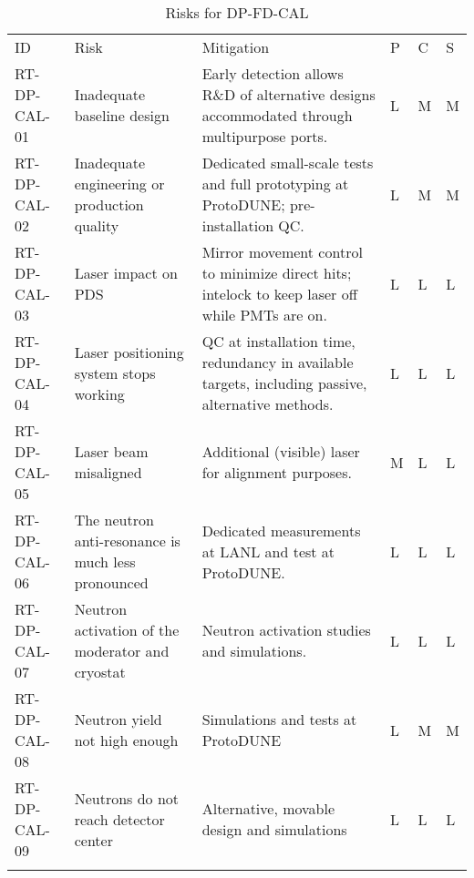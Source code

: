 
\begin{longtable}{p{}p{}p{}p{}p{}p{}} 
\caption{Risks for DP-FD-CAL } \\
\rowcolor{dunesky}
ID & Risk & Mitigation & P & C & S  \\  \colhline
RT-DP-CAL-01 & Inadequate baseline design & Early detection allows R\&D of alternative designs accommodated through multipurpose ports. & L & M & M \\  \colhline
RT-DP-CAL-02 & Inadequate engineering or production quality & Dedicated small-scale tests and full prototyping at ProtoDUNE; pre-installation QC. & L & M & M \\  \colhline
RT-DP-CAL-03 & Laser impact on PDS & Mirror movement control to minimize direct hits; intelock to keep laser off while PMTs are on. & L & L & L \\  \colhline
RT-DP-CAL-04 & Laser positioning system stops working & QC at installation time, redundancy in available targets, including passive, alternative methods. & L & L & L \\  \colhline
RT-DP-CAL-05 & Laser beam misaligned & Additional (visible) laser for alignment purposes. & M & L & L \\  \colhline
RT-DP-CAL-06 & The neutron anti-resonance is much less pronounced & Dedicated measurements at LANL and test at ProtoDUNE. & L & L & L \\  \colhline
RT-DP-CAL-07 & Neutron activation of the moderator and cryostat & Neutron activation studies and simulations. & L & L & L \\  \colhline
RT-DP-CAL-08 & Neutron yield not high enough & Simulations and tests at ProtoDUNE & L & M & M \\  \colhline
RT-DP-CAL-09 & Neutrons do not reach detector center & Alternative, movable design and simulations & L & L & L \\  \colhline

\label{tab:risks:DP-FD-CAL}
\end{longtable}